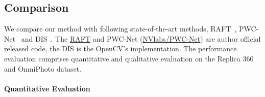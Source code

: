 


\subsection{Comparison}

We compare our method with following state-of-the-art methods, RAFT~\cite{TeedD2020a}, PWC-Net~\cite{SunYLK2018} and DIS~\cite{KroegTDV2016}. 
%
The \href{https://github.com/princeton-vl/RAFT}{RAFT} and PWC-Net (\href{https://github.com/NVlabs/PWC-Net}{NVlabs/PWC-Net}) are author official released code, the DIS is the OpenCV's implementation. 
% 
The performance evaluation comprises quantitative and qualitative evaluation on the Replica 360 and OmniPhoto dataset.


\paragraph{Quantitative Evaluation}

